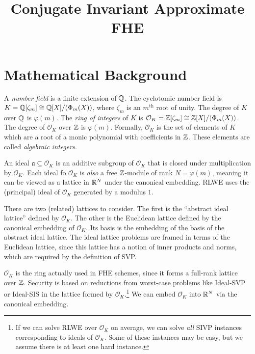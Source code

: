 \documentclass[../fheimpl.tex]{subfiles}
\begin{document}
\ifcompileasbook
\else
\title{Conjugate Invariant Approximate FHE}
\hypersetup{pageanchor=false}
\maketitle
\listoffixmes
\tableofcontents
\compileasbooktrue
\hypersetup{pageanchor=true}
\fi

\section{Mathematical Background}
A \emph{number field} is a finite extension of $\mathbb{Q}$. The cyclotomic number field is $K=\mathbb{Q}[\zeta_m]\cong\mathbb{Q}[X]/(\Phi_m(X))$, where $\zeta_m$ is an $m^\mathrm{th}$ root of unity. The degree of $K$ over $\mathbb{Q}$ is $\varphi(m)$. The \emph{ring of integers} of $K$ is $\mathcal{O}_K=\mathbb{Z}[\zeta_m]\cong \mathbb{Z}[X]/(\Phi_m(X))$. The degree of $\mathcal{O}_K$ over $\mathbb{Z}$ is $\varphi(m)$. Formally, $\mathcal{O}_K$ is the set of elements of $K$ which are a root of a monic polynomial with coefficients in $\mathbb{Z}$. These elements are called \emph{algebraic integers}.

An ideal $\mathfrak{a}\subseteq\mathcal{O}_K$ is an additive subgroup of $\mathcal{O}_K$ that is closed under multiplication by $\mathcal{O}_K$. Each ideal fo $\mathcal{O}_K$ is \emph{also} a free $\mathbb{Z}$-module of rank $N=\varphi(m)$, meaning it can be viewed as a lattice in $\mathbb{R}^N$ under the canonical embedding. RLWE uses the (principal) ideal of $\mathcal{O}_K$ generated by a modulus $1$.

There are two (related) lattices to consider. The first is the ``abstract ideal lattice'' defined by $\mathcal{O}_K$. The other is the Euclidean lattice defined by the canonical embedding of $\mathcal{O}_K$. Its basis is the embedding of the basis of the abstract ideal lattice. The ideal lattice problems are framed in terms of the Euclidean lattice, since this lattice has a notion of inner products and norms, which are required by the definition of SVP.

$\mathcal{O}_K$ is the ring actually used in FHE schemes, since it forms a full-rank lattice over $\mathbb{Z}$. Security is based on reductions from worst-case problems like Ideal-SVP or Ideal-SIS in the lattice formed by $\mathcal{O}_K$.\footnote{If we can solve RLWE over $\mathcal{O}_K$ on average, we can solve \emph{all} SIVP instances corresponding to ideals of $\mathcal{O}_K$. Some of these instances may be easy, but we assume there is at least one hard instance.} We can embed $\mathcal{O}_K$ into $\mathbb{R}^N$ via the canonical embedding.
\end{document}
